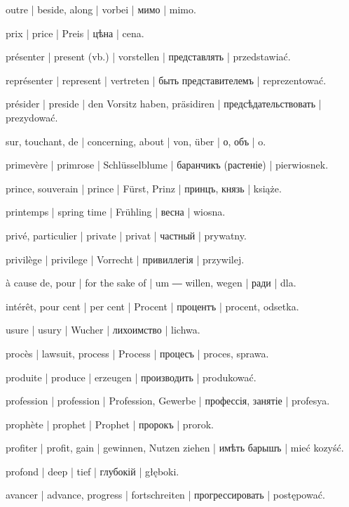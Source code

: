 \begin{outdent}{1em}
outre | beside, along | vorbei | мимо | mimo.

prix | price | Preis | цѣна | cena.

présenter | present (vb.) | vorstellen | представлять | przedstawiać.

\uvsubentry{}
représenter | represent | vertreten | быть представителемъ | reprezentować.

présider | preside | den Vorsitz haben, präsidiren | предсѣдательствовать | prezydować.

sur, touchant, de | concerning, about | von, über | о, объ | o.

primevère | primrose | Schlüsselblume | баранчикъ (растеніе) | pierwiosnek.

prince, souverain | prince | Fürst, Prinz | принцъ, князь | książe.

printemps | spring time | Frühling | весна | wiosna.

privé, particulier | private | privat | частный | prywatny.

privilège | privilege | Vorrecht | привиллегія | przywilej.

à cause de, pour | for the sake of | um ― willen, wegen | ради | dla.

intérêt, pour cent | per cent | Procent | процентъ | procent, odsetka.

\uvsubentry{}
usure | usury | Wucher | лихоимство | lichwa.

procès | lawsuit, process | Process | процесъ | proces, sprawa.

produite | produce | erzeugen | производить | produkować.

profession | profession | Profession, Gewerbe | профессія,
занятіе | profesya.

prophète | prophet | Prophet | пророкъ | prorok.

profiter | profit, gain | gewinnen, Nutzen ziehen | имѣть
барышъ | mieć kozyść.

profond | deep | tief | глубокій | głęboki.

avancer | advance, progress | fortschreiten | прогрессировать | postępować.


\end{outdent}
